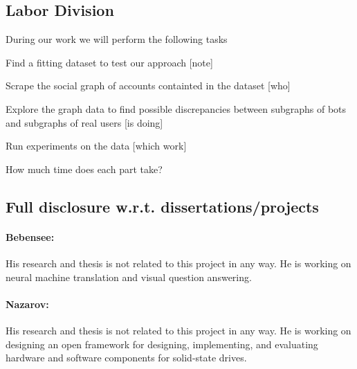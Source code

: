 
\subsection{Labor Division}

During our work we will perform the following tasks
\bit
\item Find a fitting dataset to test our approach [note]
\item Scrape the social graph of accounts containted in the dataset [who]
\item Explore the graph data to find possible discrepancies between subgraphs of bots and subgraphs of real users [is doing]
\item Run experiments on the data [which work]
\eit

\noindent How much time does each part take?

\subsection{Full disclosure w.r.t. dissertations/projects}

\paragraph{Bebensee:}
His research and thesis is not related to this project in any way. He is working on neural machine translation and visual question answering.

\paragraph{Nazarov:}
His research and thesis is not related to this project in any way. He is working on designing an open framework for designing, implementing, and evaluating hardware and software components for solid-state drives. 